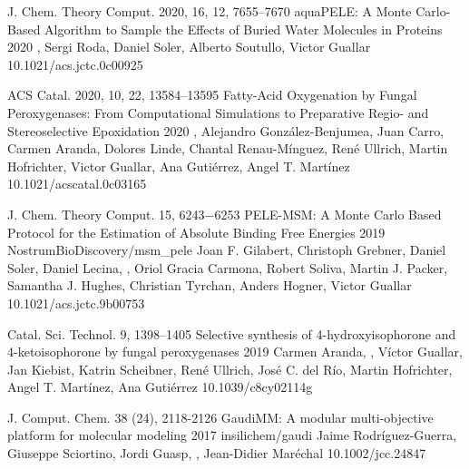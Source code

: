 \begin{cventries}
  \pubentry
    {J. Chem. Theory Comput. 2020, 16, 12, 7655–7670} %
    {aquaPELE: A Monte Carlo-Based Algorithm to Sample the Effects of Buried Water Molecules in Proteins} %
    {2020} %
    {} %
    {, Sergi Roda, Daniel Soler, Alberto Soutullo, Victor Guallar} %
    {} %
    {10.1021/acs.jctc.0c00925} %

  \pubentry
    {ACS Catal. 2020, 10, 22, 13584–13595} %
    {Fatty-Acid Oxygenation by Fungal Peroxygenases: From Computational Simulations to Preparative Regio- and Stereoselective Epoxidation} %
    {2020} %
    {} %
    {, Alejandro González-Benjumea, Juan Carro, Carmen Aranda, Dolores Linde, Chantal Renau-Mínguez, René Ullrich, Martin Hofrichter, Victor Guallar, Ana Gutiérrez, Angel T. Martínez} %
    {} %
    {10.1021/acscatal.0c03165} %

  \pubentry
    {J. Chem. Theory Comput. 15, 6243−6253} %
    {PELE-MSM: A Monte Carlo Based Protocol for the Estimation of Absolute Binding Free Energies} %
    {2019} %
    {NostrumBioDiscovery/msm\_pele} %
    {Joan F. Gilabert, Christoph Grebner, Daniel Soler, Daniel Lecina, , Oriol Gracia Carmona, Robert Soliva, Martin J. Packer, Samantha J. Hughes, Christian Tyrchan, Anders Hogner, Victor Guallar} %
    {} %
    {10.1021/acs.jctc.9b00753} %

  \pubentry
    {Catal. Sci. Technol. 9, 1398–1405} %
    {Selective synthesis of 4-hydroxyisophorone and 4-ketoisophorone by fungal peroxygenases} %
    {2019} %
    {} %
    {Carmen Aranda, , Víctor Guallar, Jan Kiebist, Katrin Scheibner, René Ullrich, José C. del Río, Martin Hofrichter,
Angel T. Martínez, Ana Gutiérrez} %
    {} %
    {10.1039/c8cy02114g} %

  \pubentry
    {J. Comput. Chem. 38 (24), 2118-2126} %
    {GaudiMM: A modular multi-objective platform for molecular modeling} %
    {2017} %
    {insilichem/gaudi} %
    {Jaime Rodríguez-Guerra, Giuseppe Sciortino, Jordi Guasp, , Jean-Didier Maréchal} %
    {} %
    {10.1002/jcc.24847} %

\end{cventries}
